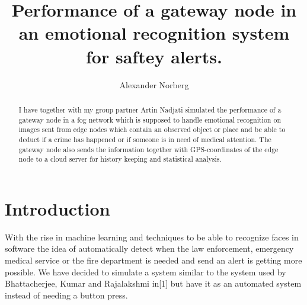 \documentclass[a4paper,11pt,notitlepage]{article}
\title{Performance of a gateway node in an emotional recognition system for saftey alerts.}
\author{Alexander Norberg}
\begin{document}
%
  \maketitle
  \twocolumn
  \begin{abstract}
    I have together with my group partner Artin Nadjati simulated the performance of a
    gateway node in a fog network which is supposed to handle emotional recognition on
    images sent from edge nodes which contain an observed object or place and be able to
    deduct if a crime has happened or if someone is in need of medical attention. The
    gateway node also sends the information together with GPS-coordinates of the edge
    node to a cloud server for history keeping and statistical analysis.
  \end{abstract}
  
  \section{Introduction}
    With the rise in machine learning and techniques to be able to recognize faces in
    software the idea of automatically detect when the law enforcement, emergency medical
    service or the fire department is needed and send an alert is getting more possible.
    We have decided to simulate a system similar to the system used by Bhattacherjee, Kumar
    and Rajalakshmi in[1] but have it as an automated system instead of needing a button
    press.
\end{document}
